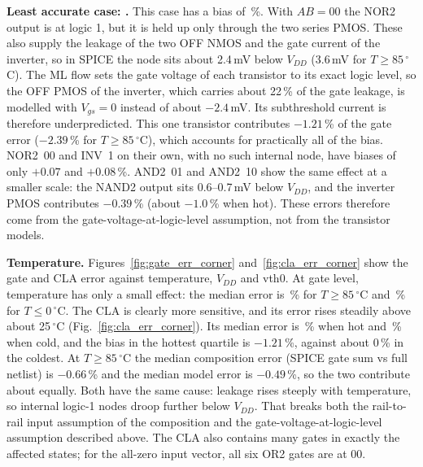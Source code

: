 \documentclass[12pt]{article}
\begin{document}
\textbf{Least accurate case: \GateWorst{}.} This case has a bias of \GateWorstBias\,\%. With
$AB=00$ the NOR2 output is at logic 1, but it is held up only through the two series PMOS. These
also supply the leakage of the two OFF NMOS and the gate current of the inverter, so in SPICE the
node sits about 2.4\,mV below $V_{DD}$ (3.6\,mV for $T\ge85\,^\circ$C). The ML flow sets the gate
voltage of each transistor to its exact logic level, so the OFF PMOS of the inverter, which carries
about 22\,\% of the gate leakage, is modelled with $V_{gs}=0$ instead of about $-2.4$\,mV. Its
subthreshold current is therefore underpredicted. This one transistor contributes $-1.21$\,\% of
the gate error ($-2.39$\,\% for $T\ge85\,^\circ$C), which accounts for practically all of the
bias. NOR2~00 and INV~1 on their own, with no such internal node, have biases of only $+0.07$ and
$+0.08$\,\%. AND2~01 and AND2~10 show the same effect at a smaller scale: the NAND2 output sits
0.6--0.7\,mV below $V_{DD}$, and the inverter PMOS contributes $-0.39$\,\% (about $-1.0$\,\% when
hot). These errors therefore come from the gate-voltage-at-logic-level assumption, not from the
transistor models.

\textbf{Temperature.} Figures~\ref{fig:gate_err_corner} and~\ref{fig:cla_err_corner} show the gate
and CLA error against temperature, $V_{DD}$ and vth0. At gate level, temperature has only a small effect: the median error is
\GateErrHot\,\% for $T \ge 85\,^\circ$C and \GateErrCold\,\% for $T\le0\,^\circ$C. The CLA is
clearly more sensitive, and its error rises steadily above about 25\,$^\circ$C
(Fig.~\ref{fig:cla_err_corner}). Its median error is \ClaErrHot\,\% when hot and \ClaErrCold\,\% when cold,
and the bias in the hottest quartile is $-1.21$\,\%, against about 0\,\% in the coldest. At
$T\ge85\,^\circ$C the median composition error (SPICE gate sum vs full netlist) is $-0.66$\,\% and
the median model error is $-0.49$\,\%, so the two contribute about equally. Both have the same
cause: leakage rises steeply with temperature, so internal logic-1 nodes droop further below
$V_{DD}$. That breaks both the rail-to-rail input assumption of the composition and the
gate-voltage-at-logic-level assumption described above. The CLA also contains many gates in exactly
the affected states; for the all-zero input vector, all six OR2 gates are at 00.
\end{document}
